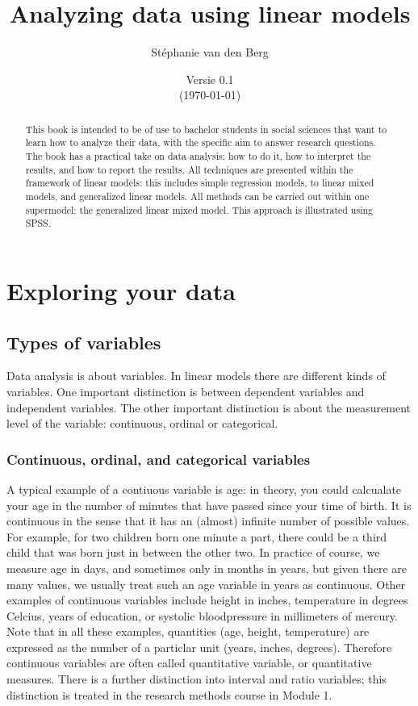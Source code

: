 \documentclass[]{report}\usepackage[]{graphicx}\usepackage[]{color}
\title{Analyzing data using linear models}
\author{St\'ephanie van den Berg}
\date{Versie 0.1 \\ (\today)}
\begin{document}
\maketitle




\begin{abstract}
This book is intended to be of use to bachelor students in social sciences that want to learn how to analyze their data, with the specific aim to answer research questions. The book has a practical take on data analysis: how to do it, how to interpret the results, and how to report the results. All techniques are presented within the framework of linear models: this includes simple regression models, to linear mixed models, and generalized linear models. All methods can be carried out within one supermodel: the generalized linear mixed model. This approach is illustrated using SPSS.
\end{abstract}


\tableofcontents



\chapter{Exploring your data}

\section{Types of variables}
Data analysis is about variables. In linear models there are different kinds of variables. One important distinction is between dependent variables and independent variables. The other important distinction is about the measurement level of the variable: continuous, ordinal or categorical. 


\subsection{Continuous, ordinal, and categorical variables}
A typical example of a contiuous variable is age: in theory, you could calcualate your age in the number of minutes that have passed since your time of birth. It is continuous in the sense that it has an (almost) infinite number of possible values. For example, for two children born one minute a part, there could be a third child that was born just in between the other two. In practice of course, we measure age in days, and sometimes only in months in years, but given there are many values, we usually treat such an age variable in years as continuous. Other examples of continuous variables include height in inches, temperature in degrees Celcius, years of education, or systolic bloodpressure in millimeters of mercury. Note that in all these examples, quantities (age, height, temperature) are expressed as the number of a particlar unit (years, inches, degrees). Therefore continuous variables are often called quantitative variable, or quantitative measures. There is a further distinction into interval and ratio variables; this distinction is treated in the research methods course in Module 1.
\end{document}
